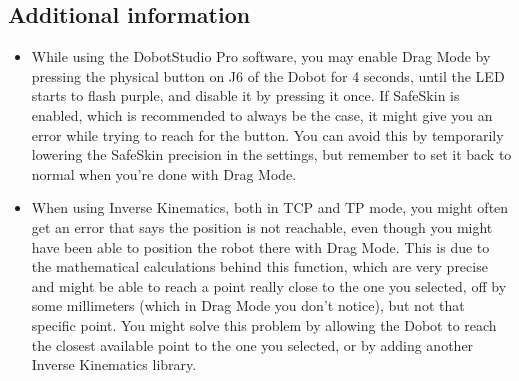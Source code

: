\documentclass[11pt,a4paper]{article}
\begin{document}
\subsection{Additional information}
\label{sec:additional-info}

\begin{itemize}[leftmargin=1.2cm]

\item While using the DobotStudio Pro software, you may enable Drag Mode by pressing the physical button on J6 of the Dobot for 4 seconds, until the LED starts to flash purple, and disable it by pressing it once. If SafeSkin is enabled, which is recommended to always be the case, it might give you an error while trying to reach for the button. You can avoid this by temporarily lowering the SafeSkin precision in the settings, but remember to set it back to normal when you're done with Drag Mode.

\item When using Inverse Kinematics, both in TCP and TP mode, you might often get an error that says the position is not reachable, even though you might have been able to position the robot there with Drag Mode. This is due to the mathematical calculations behind this function, which are very precise and might be able to reach a point really close to the one you selected, off by some millimeters (which in Drag Mode you don't notice), but not that specific point. You might solve this problem by allowing the Dobot to reach the closest available point to the one you selected, or by adding another Inverse Kinematics library.

\end{itemize}
\end{document}
